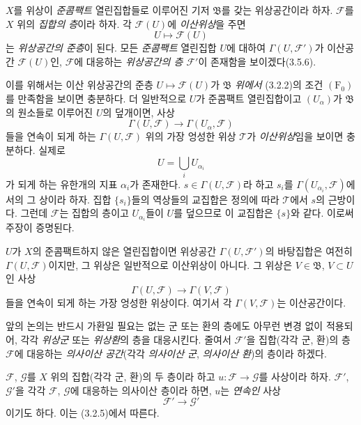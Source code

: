 \begin{env}[3.8.1]
\label{0.3.8.1-ko}
$X$를 위상이 \emph{준콤팩트} 열린집합들로 이루어진 기저 $\mathfrak B$를 갖는 위상공간이라 하자. $\mathcal F$를 $X$ 위의 \emph{집합의 층}이라 하자. 각 $\mathcal F(U)$에 \emph{이산위상}을 주면
\[
  U\longmapsto\mathcal F(U)
\]
는 \emph{위상공간의 준층}이 된다. 모든 \emph{준콤팩트} 열린집합 $U$에 대하여 $\Gamma(U,\mathcal F')$가 이산공간 $\mathcal F(U)$인, $\mathcal F$에 대응하는 \emph{위상공간의 층 $\mathcal F'$}이 존재함을 보이겠다(3.5.6).

이를 위해서는 이산 위상공간의 준층 $U\mapsto\mathcal F(U)$가 $\mathfrak B$ \emph{위에서} (3.2.2)의 조건 $(\mathrm F_0)$를 만족함을 보이면 충분하다. 더 일반적으로 $U$가 준콤팩트 열린집합이고 $(U_\alpha)$가 $\mathfrak B$의 원소들로 이루어진 $U$의 덮개이면, 사상
\[
  \Gamma(U,\mathcal F)\longrightarrow
  \Gamma(U_\alpha,\mathcal F)
\]
들을 연속이 되게 하는 $\Gamma(U,\mathcal F)$ 위의 가장 엉성한 위상 $\mathcal T$가 \emph{이산위상}임을 보이면 충분하다. 실제로
\[
  U=\bigcup_iU_{\alpha_i}
\]
가 되게 하는 유한개의 지표 $\alpha_i$가 존재한다. $s\in\Gamma(U,\mathcal F)$라 하고 $s_i$를 $\Gamma(U_{\alpha_i},\mathcal F)$에서의 그 상이라 하자. 집합 $\{s_i\}$들의 역상들의 교집합은 정의에 따라 $\mathcal T$에서 $s$의 근방이다. 그런데 $\mathcal F$는 집합의 층이고 $U_{\alpha_i}$들이 $U$를 덮으므로 이 교집합은 $\{s\}$와 같다. 이로써 주장이 증명된다.

$U$가 $X$의 준콤팩트하지 않은 열린집합이면 위상공간 $\Gamma(U,\mathcal F')$의 바탕집합은 여전히 $\Gamma(U,\mathcal F)$이지만, 그 위상은 일반적으로 이산위상이 아니다. 그 위상은 $V\in\mathfrak B$, $V\subset U$인 사상
\[
  \Gamma(U,\mathcal F)\longrightarrow\Gamma(V,\mathcal F)
\]
들을 연속이 되게 하는 가장 엉성한 위상이다. 여기서 각 $\Gamma(V,\mathcal F)$는 이산공간이다.

앞의 논의는 반드시 가환일 필요는 없는 군 또는 환의 층에도 아무런 변경 없이 적용되어, 각각 \emph{위상군} 또는 \emph{위상환}의 층을 대응시킨다. 줄여서 $\mathcal F'$을 집합(각각 군, 환)의 층 $\mathcal F$에 대응하는 \emph{의사이산 공간}(각각 \emph{의사이산 군}, \emph{의사이산 환})의 층이라 하겠다.
\end{env}

\begin{env}[3.8.2]
\label{0.3.8.2-ko}
$\mathcal F$, $\mathcal G$를 $X$ 위의 집합(각각 군, 환)의 두 층이라 하고 $u:\mathcal F\to\mathcal G$를 사상이라 하자. $\mathcal F'$, $\mathcal G'$을 각각 $\mathcal F$, $\mathcal G$에 대응하는 의사이산 층이라 하면, $u$는 \emph{연속인} 사상
\[
  \mathcal F'\longrightarrow\mathcal G'
\]
이기도 하다. 이는 (3.2.5)에서 따른다.
\end{env}


